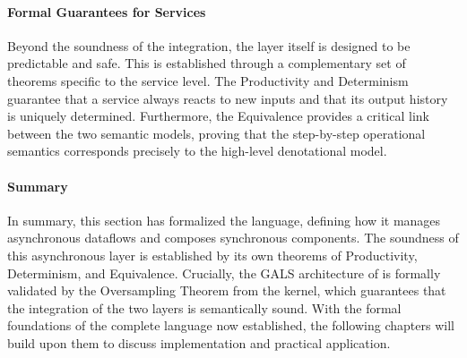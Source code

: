 \paragraph{Formal Guarantees for Services}
Beyond the soundness of the integration, the \GRFRP layer itself is designed to be predictable and
safe. This is established through a complementary set of theorems specific to the service level.
The Productivity and Determinism
guarantee that a service always reacts to new inputs and that its output history is uniquely
determined. Furthermore, the Equivalence 
provides a critical link between the two semantic models, proving that the step-by-step operational
semantics corresponds precisely to the high-level denotational model.

\paragraph{Summary}
In summary, this section has formalized the \GRFRP language, defining how it manages asynchronous
dataflows and composes synchronous components. The soundness of this asynchronous layer is
established by its own theorems of Productivity, Determinism, and Equivalence. Crucially, the GALS
architecture of \GRust is formally validated by the Oversampling Theorem from the \GRSync kernel,
which guarantees that the integration of the two layers is semantically sound. With the formal
foundations of the complete language now established, the following chapters will build upon them to
discuss implementation and practical application.
